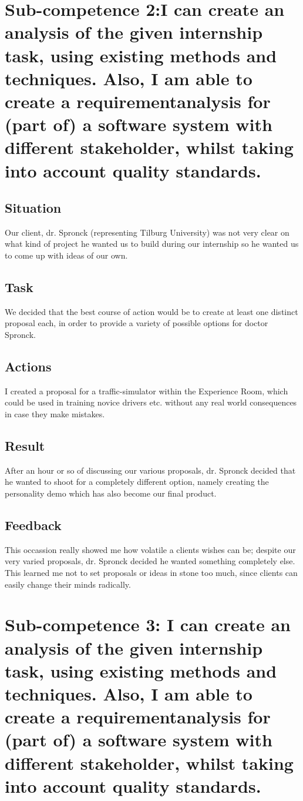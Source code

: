 \documentclass[11pt]{article}
\begin{document}
\newpage
\section{Sub-competence 2:I can create an analysis of the given internship task,
using existing methods and
techniques. Also, I am
able to create a requirementanalysis
for (part of) a software
system with different
stakeholder, whilst taking into
account quality standards. } 
\subsection{Situation}
Our client, dr. Spronck (representing Tilburg University) was not very clear on what kind of project he wanted us to build during our internship so he wanted us to come up with ideas of our own.
\subsection{Task}
We decided that the best course of action would be to create at least one distinct proposal each, in order to provide a variety of possible options for doctor Spronck.
\subsection{Actions}
I created a proposal for a traffic-simulator within the Experience Room, which could be used in training novice drivers etc. without any real world consequences in case they make mistakes.
\subsection{Result}
After an hour or so of discussing our various proposals, dr. Spronck decided that he wanted to shoot for a completely different option, namely creating the personality demo which has also become our final product.
\subsection{Feedback}
This occassion really showed me how volatile a clients wishes can be; despite our very varied proposals, dr. Spronck decided he wanted something completely else. This learned me not to set proposals or ideas in stone too much, since clients can easily change their minds radically.


\newpage
\section{Sub-competence 3: I can create an analysis of
the given internship task,
using existing methods and
techniques. Also, I am
able to create a requirementanalysis
for (part of) a software
system with different
stakeholder, whilst taking into
account quality standards. } 
\end{document}
